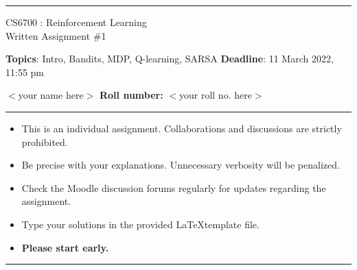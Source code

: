 \documentclass[addpoints,12pt,solution]{exam}
\begin{document}
\hrule
\vspace{1mm}
\noindent 
\begin{center}
{\Large CS6700 : Reinforcement Learning} \\
{\large Written Assignment \#1}
\end{center}
\vspace{1mm}
\noindent 
{\textbf{Topics}: Intro, Bandits, MDP, Q-learning, SARSA \hfill \textbf{Deadline}: 11 March 2022, 11:55 pm}


 $<$your name here$>$ \hfill {\bf Roll number:} $<$your roll no. here$>$
\vspace{2mm}
\hrule

{\small

\begin{itemize}\itemsep0mm
\item This is an individual assignment. Collaborations and discussions are strictly
prohibited.
\item Be precise with your explanations. Unnecessary verbosity will be penalized.
\item Check the Moodle discussion forums regularly for updates regarding the assignment.
\item Type your solutions in the provided \LaTeX template file.
\item \textbf{Please start early.}
\end{itemize}
}

\hrule

\vspace{3mm}




\end{document}
